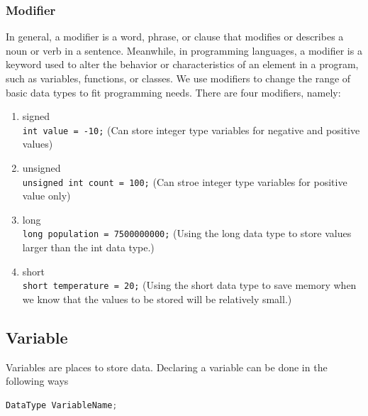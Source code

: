 \subsubsection{Modifier}
In general, a modifier is a word, phrase, or clause that modifies or describes a noun or verb in a sentence. Meanwhile, in programming languages, a modifier is a keyword used to alter the behavior or characteristics of an element in a program, such as variables, functions, or classes. We use modifiers to change the range of basic data types to fit programming needs. There are four modifiers, namely:
\begin{enumerate}
	\item signed \\
	      \verb|int value = -10;| (Can store integer type variables for negative and positive values)
	\item unsigned \\
	      \verb|unsigned int count = 100;|  (Can stroe integer type variables for positive value only)
	\item long \\
	      \verb|long population = 7500000000;| (Using the long data type to store values larger than the int data type.)
	\item short \\
	      \verb|short temperature = 20;| (Using the short data type to save memory when we know that the values to be stored will be relatively small.)
\end{enumerate}


\subsection{Variable}
Variables are places to store data. Declaring a variable can be done in the following ways
\begin{lstlisting}[language=c,caption=C variable declaration,label=lst:deklarasivariabel,captionpos=t]
DataType VariableName;
\end{lstlisting}
